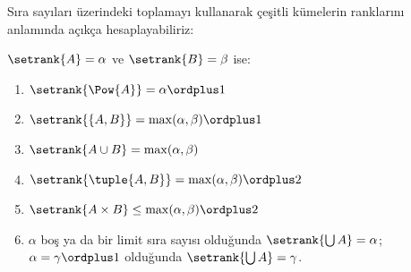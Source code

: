 


Sıra sayıları üzerindeki toplamayı kullanarak çeşitli kümelerin ranklarını
 anlamında açıkça hesaplayabiliriz:

\begin{lem}
$\setrank{A}=\alpha$ ve $\setrank{B}=\beta$ ise:
\begin{enumerate}
	\item{} $\setrank{\Pow{A}}=\alpha\ordplus 1$
	\item{} $\setrank{\{A,B\}}=\max(\alpha,
	\beta)\ordplus 1$
	\item{} $\setrank{A\cup B}=\max(\alpha,
	\beta)$
	\item{} $\setrank{\tuple{A,B}}=\max(\alpha,
	\beta)\ordplus 2$
	\item{} $\setrank{A\times B}\leq\max(\alpha,
	\beta)\ordplus 2$
	\item{} $\alpha$ boş ya da bir limit sıra sayısı
	olduğunda $\setrank{\bigcup A}=\alpha$; $\alpha=\gamma\ordplus 1$
	olduğunda $\setrank{\bigcup A}=\gamma$.
\end{enumerate}
\end{lem}

